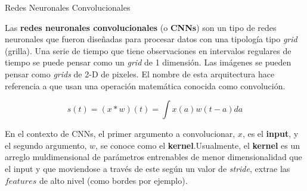 \documentclass[9pt]{beamer}
\begin{document}
\begin{frame}{Redes Neuronales Convolucionales}

Las \textbf{redes neuronales convolucionales} (o \textbf{CNNs}) son un tipo de redes neuronales que fueron diseñadas para procesar datos con una tipología tipo \textit{grid} (grilla). Una serie de tiempo que tiene observaciones en intervalos regulares de tiempo se puede pensar como un \textit{grid} de 1 dimensión. Las imágenes se pueden pensar como \textit{grids} de 2-D de pixeles. El nombre de esta arquitectura hace referencia a que usan una operación matemática conocida como convolución. \pause 

\begin{equation*}
s(t) = (x * w)(t) = \int x(a)w(t-a)da
\end{equation*} \pause 

En el contexto de CNNs, el primer argumento a convolucionar, $x$, es el \textbf{input}, y el segundo argumento, $w$, se conoce como el \textbf{kernel}.\pause Usualmente, el \textbf{kernel} es un arreglo muldimensional de parámetros entrenables de menor dimensionalidad que el input y que moviendose a través de este según un valor de \textit{stride}, extrae las $\textit{features}$ de alto nivel (como bordes por ejemplo). 

\end{frame}
\end{document}
